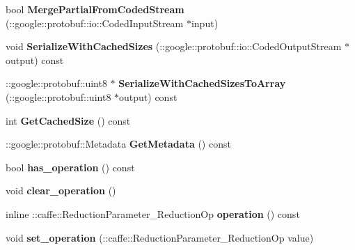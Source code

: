 \begin{DoxyCompactItemize}
bool {\bfseries Merge\+Partial\+From\+Coded\+Stream} (\+::google\+::protobuf\+::io\+::\+Coded\+Input\+Stream $\ast$input)
\item 
\mbox{\label{classcaffe_1_1_reduction_parameter_a51c6fc64071d7e644837fefbbe8f9d64}} 
void {\bfseries Serialize\+With\+Cached\+Sizes} (\+::google\+::protobuf\+::io\+::\+Coded\+Output\+Stream $\ast$output) const
\item 
\mbox{\label{classcaffe_1_1_reduction_parameter_a010627ff01c3c3633f28dba1484e255c}} 
\+::google\+::protobuf\+::uint8 $\ast$ {\bfseries Serialize\+With\+Cached\+Sizes\+To\+Array} (\+::google\+::protobuf\+::uint8 $\ast$output) const
\item 
\mbox{\label{classcaffe_1_1_reduction_parameter_adc8da857d192bb842d2b2ce0cb3149be}} 
int {\bfseries Get\+Cached\+Size} () const
\item 
\mbox{\label{classcaffe_1_1_reduction_parameter_ad691b8a103fa8327988d399db618226d}} 
\+::google\+::protobuf\+::\+Metadata {\bfseries Get\+Metadata} () const
\item 
\mbox{\label{classcaffe_1_1_reduction_parameter_a9c7b5ecf9e479cf912303071e76774e8}} 
bool {\bfseries has\+\_\+operation} () const
\item 
\mbox{\label{classcaffe_1_1_reduction_parameter_a5e7cef2077214f12c1e40ec3681ea713}} 
void {\bfseries clear\+\_\+operation} ()
\item 
\mbox{\label{classcaffe_1_1_reduction_parameter_a4c249e981884000c270b56202e9d4705}} 
inline \+::caffe\+::\+Reduction\+Parameter\+\_\+\+Reduction\+Op {\bfseries operation} () const
\item 
\mbox{\label{classcaffe_1_1_reduction_parameter_af7c40dc26527195e73bbbdf97541ed62}} 
void {\bfseries set\+\_\+operation} (\+::caffe\+::\+Reduction\+Parameter\+\_\+\+Reduction\+Op value)
\item 
\mbox{\label{classcaffe_1_1_reduction_parameter_a3df47ae0c62970ad1ce8f37e70dfb041}} 

\end{DoxyCompactItemize}
